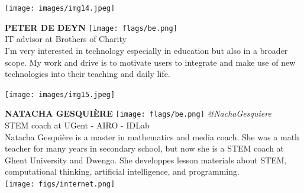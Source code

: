 \documentclass[11pt]{article}
\begin{document}
\noindent
\begin{minipage}{0.3\textwidth}
\centering
\texttt{[image: images/img14.jpeg]}
\end{minipage}
\hfill
\begin{minipage}{0.6\textwidth}\raggedright
\color{color1}\uppercase{\textbf{Peter De Deyn}}
\color{color2}\hspace{0.2cm}\texttt{[image: flags/be.png]}
\\
IT advisor at Brothers of Charity\\
{\footnotesize I'm very interested in  technology especially in education but also in a broader scope. My work and drive is to motivate users to integrate and make use of new technologies into their teaching and daily life.}\\
\end{minipage}
\newline\newline\newline

\noindent
\begin{minipage}{0.3\textwidth}
\centering
\texttt{[image: images/img15.jpeg]}
\end{minipage}
\hfill
\begin{minipage}{0.6\textwidth}\raggedright
\color{color1}\uppercase{\textbf{Natacha Gesquière}}
\color{color2}\hspace{0.2cm}\texttt{[image: flags/be.png]}
\hspace{0.2cm}\textit{@NachaGesquiere}
\\
STEM coach at UGent - AIRO - IDLab \\
{\footnotesize Natacha Gesquière is a master in mathematics and media coach. She was a math teacher for many years in secondary school, but now she is a STEM coach at Ghent University and Dwengo. She developpes lesson materials about STEM, computational thinking, artificial intelligence, and programming. }\\
\texttt{[image: figs/internet.png]}
\end{minipage}
\newline\newline\newline
\end{document}
